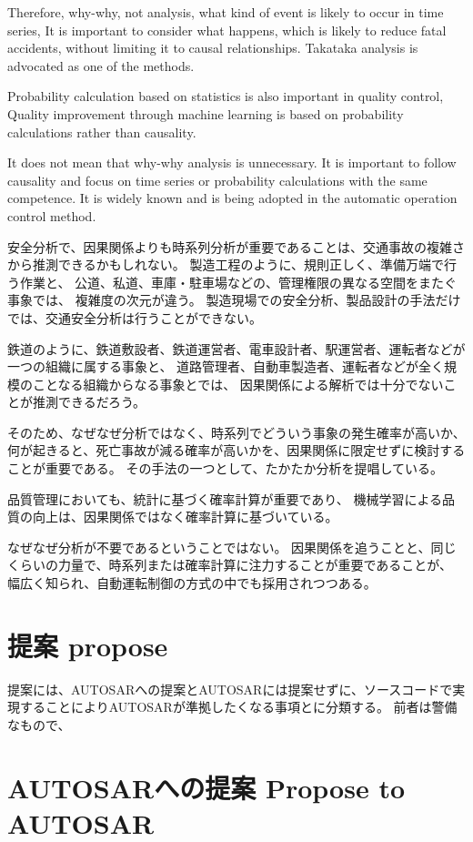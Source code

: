 \documentclass[twocolumn]{article} %
\begin{document}
Therefore, why-why, not analysis, what kind of event is likely to occur in time series,
It is important to consider what happens, which is likely to reduce fatal accidents, without limiting it to causal relationships.
Takataka analysis is advocated as one of the methods.

Probability calculation based on statistics is also important in quality control,
Quality improvement through machine learning is based on probability calculations rather than causality.

It does not mean that why-why analysis is unnecessary.
It is important to follow causality and focus on time series or probability calculations with the same competence.
It is widely known and is being adopted in the automatic operation control method.

安全分析で、因果関係よりも時系列分析が重要であることは、交通事故の複雑さから推測できるかもしれない。
製造工程のように、規則正しく、準備万端で行う作業と、
公道、私道、車庫・駐車場などの、管理権限の異なる空間をまたぐ事象では、
複雑度の次元が違う。
製造現場での安全分析、製品設計の手法だけでは、交通安全分析は行うことができない。

鉄道のように、鉄道敷設者、鉄道運営者、電車設計者、駅運営者、運転者などが一つの組織に属する事象と、
道路管理者、自動車製造者、運転者などが全く規模のことなる組織からなる事象とでは、
因果関係による解析では十分でないことが推測できるだろう。

そのため、なぜなぜ分析ではなく、時系列でどういう事象の発生確率が高いか、
何が起きると、死亡事故が減る確率が高いかを、因果関係に限定せずに検討することが重要である。
その手法の一つとして、たかたか分析を提唱している。

品質管理においても、統計に基づく確率計算が重要であり、
機械学習による品質の向上は、因果関係ではなく確率計算に基づいている。

なぜなぜ分析が不要であるということではない。
因果関係を追うことと、同じくらいの力量で、時系列または確率計算に注力することが重要であることが、
幅広く知られ、自動運転制御の方式の中でも採用されつつある。

\section{提案 propose}
提案には、AUTOSARへの提案とAUTOSARには提案せずに、ソースコードで実現することによりAUTOSARが準拠したくなる事項とに分類する。
前者は警備なもので、
\section{AUTOSARへの提案 Propose to AUTOSAR}
\end{document}
